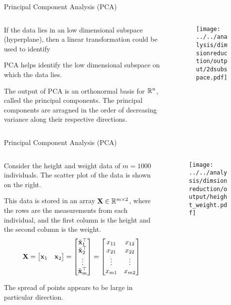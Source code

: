 \documentclass[aspectratio=169]{beamer}
\def\mf{\ensuremath\mathbf}
\def\mb{\ensuremath\mathbb}
\def\emx{\ensuremath\end{bmatrix*}}
\def\bmxc{\ensuremath\begin{bmatrix*}[c]}
\begin{document}
\begin{frame}[t]{Principal Component Analysis (PCA)}
  \begin{columns}
    \begin{column}{0.4\textwidth}
      If the data lies in an low dimensional subspace (hyperplane), then a linear transformation could be used to identify 
      \vspace{0.2cm}

      PCA helps identify the low dimensional subspace on which the data lies.
      \vspace{0.2cm}

      The output of PCA is an orthonormal basis for $\mb{R}^n$, called the principal components. The principal components are arragned in the order of decreasing variance along their respective directions.
    \end{column}
    \begin{column}{0.575\textwidth}
      \begin{figure}
        \centering
        \texttt{[image: ../../analysis/dimsionreduction/output/2dsubspace.pdf]}
      \end{figure}
    \end{column}
  \end{columns}
\end{frame}


\begin{frame}[t]{Principal Component Analysis (PCA)}
  \begin{columns}
    \begin{column}{0.55\textwidth}
      {\small
      Consider the height and weight data of $m=1000$ individuals. The scatter plot of the data is shown on the right.
      \vspace{0.2cm}

      This data is stored in an array $\mf{X} \in \mb{R}^{m \times 2}$, where the rows are the measurements from each individual, and the first column is the height and the second column is the weight.
      \[ \mf{X} = \bmxc \mf{x}_{1} & \mf{x}_{2} \emx = \bmxc \tilde{\mf{x}}_{1}^\top \\ \tilde{\mf{x}}_{2}^\top \\ \vdots \\ \tilde{\mf{x}}_{m}^\top \emx = \bmxc x_{11} & x_{12} \\ x_{21} & x_{22} \\ \vdots & \vdots \\ x_{m1} & x_{m2}\emx\]

      The spread of points appears to be large in particular direction.
      }
    \end{column}
    \begin{column}{0.425\textwidth}
      \begin{figure}
        \centering
        \texttt{[image: ../../analysis/dimsionreduction/output/height\_weight.pdf]}
      \end{figure}
    \end{column}
  \end{columns}
\end{frame}
\end{document}
